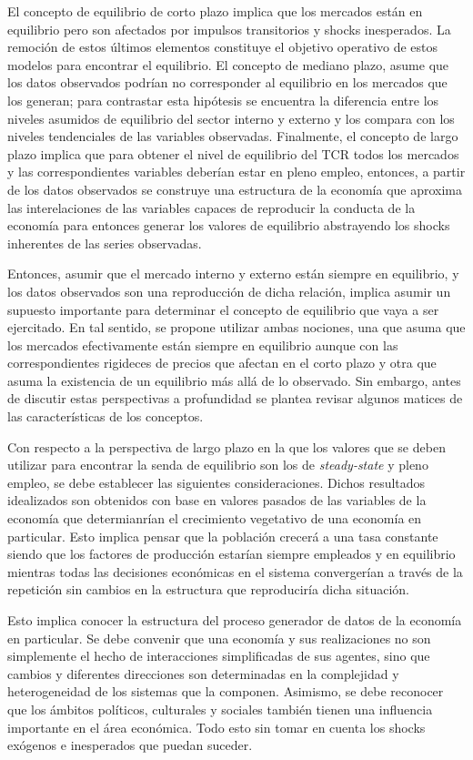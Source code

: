 \documentclass[12pt,letterpaper]{article}
\begin{document}
El concepto de equilibrio de corto plazo implica que los mercados están en equilibrio pero son afectados por impulsos transitorios y shocks inesperados. La remoción de estos últimos elementos constituye el objetivo operativo de estos modelos para encontrar el equilibrio. El concepto de mediano plazo, asume que los datos observados podrían no corresponder al equilibrio en los mercados que los generan; para contrastar esta hipótesis se encuentra la diferencia entre los niveles asumidos de equilibrio del sector interno y externo y los compara con los niveles tendenciales de las variables observadas. Finalmente, el concepto de largo plazo implica que para obtener el nivel de equilibrio del TCR todos los mercados y las correspondientes variables deberían estar en pleno empleo, entonces, a partir de los datos observados se construye una estructura de la economía que aproxima las interelaciones de las variables capaces de reproducir la conducta de la economía para entonces generar los valores de equilibrio abstrayendo los shocks inherentes de las series observadas.

Entonces, asumir que el mercado interno y externo están siempre en equilibrio, y los datos observados son una reproducción de dicha relación, implica asumir un supuesto importante para determinar el concepto de equilibrio que vaya a ser ejercitado. En tal sentido, se propone utilizar ambas nociones, una que asuma que los mercados efectivamente están siempre en equilibrio aunque con las correspondientes rigideces de precios que afectan en el corto plazo y otra que asuma la existencia de un equilibrio más allá de lo observado. Sin embargo, antes de discutir estas perspectivas a profundidad se plantea revisar algunos matices de las características de los conceptos.

Con respecto a la perspectiva de largo plazo en la que los valores que se deben utilizar para encontrar la senda de equilibrio son los de \emph{steady-state} y pleno empleo, se debe establecer las siguientes consideraciones. Dichos resultados idealizados son obtenidos con base en valores pasados de las variables de la economía que determianrían el crecimiento vegetativo de una economía en particular. Esto implica pensar que la población crecerá a una tasa constante siendo que los factores de producción estarían siempre empleados y en equilibrio mientras todas las decisiones económicas en el sistema convergerían a través de la repetición sin cambios en la estructura que reproduciría dicha situación. 

Esto implica conocer la estructura del proceso generador de datos de la economía en particular. Se debe convenir que una economía y sus realizaciones no son simplemente el hecho de interacciones simplificadas de sus agentes, sino que cambios y diferentes direcciones son determinadas en la complejidad y heterogeneidad de los sistemas que la componen. Asimismo, se debe reconocer que los ámbitos políticos, culturales y sociales también tienen una influencia importante en el área económica. Todo esto sin tomar en cuenta los shocks exógenos e inesperados que puedan suceder.
\end{document}
